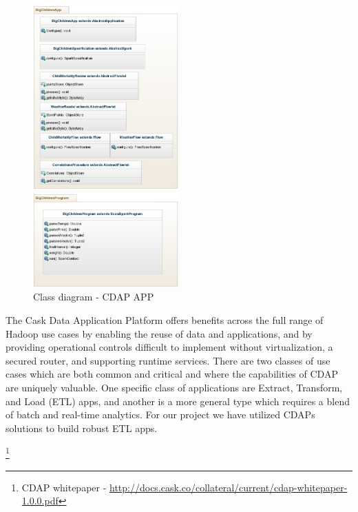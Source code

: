 \documentclass[
10pt, %
a4paper, %
oneside, %
headinclude,footinclude, %
useAMS,
usenatbib
]{template/mn2e}  %
\begin{document}
\begin{figure}
  \centering
  \includegraphics[width=0.50\textwidth]{src/BigChild_ClassDiagram2}
  \caption{Class diagram - CDAP APP}
  \label{fig:classdiagram}
\end{figure}

The Cask Data Application Platform offers benefits across the full range of Hadoop use cases by enabling the reuse of data and applications, and by providing operational controls difficult to implement without virtualization, a secured router, and supporting runtime services. There are two classes of use cases which are both common and critical and where the capabilities of CDAP are uniquely valuable. One specific class of applications are Extract, Transform, and Load (ETL) apps, and another is a more general type which requires a blend of batch and real-time analytics. For our project we have utilized CDAPs solutions to build robust ETL apps.

\footnote{CDAP whitepaper - \url{http://docs.cask.co/collateral/current/cdap-whitepaper-1.0.0.pdf}}
\end{document}
